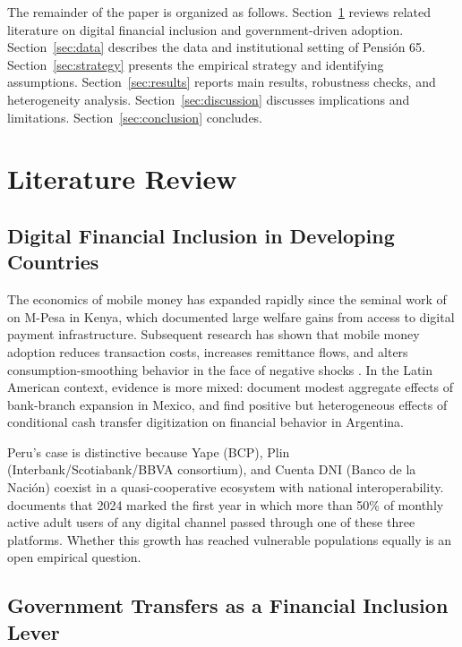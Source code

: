 \documentclass[12pt]{article}
\begin{document}
The remainder of the paper is organized as follows.
Section~\ref{sec:literature} reviews related literature on digital financial inclusion and government-driven adoption.
Section~\ref{sec:data} describes the data and institutional setting of Pensi\'on 65.
Section~\ref{sec:strategy} presents the empirical strategy and identifying assumptions.
Section~\ref{sec:results} reports main results, robustness checks, and heterogeneity analysis.
Section~\ref{sec:discussion} discusses implications and limitations.
Section~\ref{sec:conclusion} concludes.


\section{Literature Review}
\label{sec:literature}

\subsection{Digital Financial Inclusion in Developing Countries}

The economics of mobile money has expanded rapidly since the seminal work of \citet{jack2014} on M-Pesa in Kenya, which documented large welfare gains from access to digital payment infrastructure. Subsequent research has shown that mobile money adoption reduces transaction costs, increases remittance flows, and alters consumption-smoothing behavior in the face of negative shocks \citep{suri2017}. In the Latin American context, evidence is more mixed: \citet{bruhn2014} document modest aggregate effects of bank-branch expansion in Mexico, and \citet{galiani2020} find positive but heterogeneous effects of conditional cash transfer digitization on financial behavior in Argentina.

Peru's case is distinctive because Yape (BCP), Plin (Interbank/Scotiabank/BBVA consortium), and Cuenta DNI (Banco de la Naci\'on) coexist in a quasi-cooperative ecosystem with national interoperability. \citet{bcrp2024report} documents that 2024 marked the first year in which more than 50\% of monthly active adult users of any digital channel passed through one of these three platforms. Whether this growth has reached vulnerable populations equally is an open empirical question.

\subsection{Government Transfers as a Financial Inclusion Lever}
\end{document}
